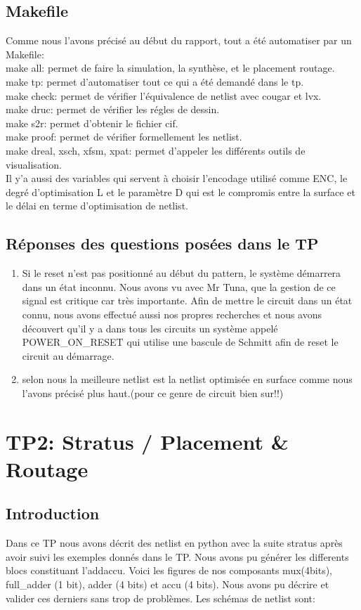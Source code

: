 \documentclass[12pt]{article}
\begin{document}
\subsection{Makefile}
Comme nous l'avons précisé au début du rapport, tout a été automatiser par un Makefile:\\
make all: permet de faire la simulation, la synthèse, et le placement routage.\\
make tp: permet d'automatiser tout ce qui a été demandé dans le tp.\\
make check: permet de vérifier l'équivalence de netlist avec cougar et lvx.\\
make druc: permet de vérifier les régles de dessin.\\
make s2r: permet d'obtenir le fichier cif.\\
make proof: permet de vérifier formellement les netlist.\\
make dreal, xsch, xfsm, xpat: permet d'appeler les différents outils de visualisation.\\
Il y'a aussi des variables qui servent à choisir l'encodage utilisé comme ENC, le degré d'optimisation L et le paramètre D qui est le compromis entre la surface et le délai en terme d'optimisation de netlist.\\
\subsection{Réponses des questions posées dans le TP}
\begin{enumerate}
\item Si le reset n'est pas positionné au début du pattern, le système démarrera dans un état inconnu. Nous avons vu avec Mr Tuna, que la gestion de ce signal est critique car très importante. Afin de mettre le circuit dans un état connu, nous avons effectué aussi nos propres recherches et nous avons découvert qu’il y a dans tous les circuits un système appelé POWER\_ON\_RESET qui utilise une bascule de Schmitt afin de reset le circuit au démarrage.

\item selon nous la meilleure netlist est la netlist optimisée en surface comme nous l'avons précisé plus haut.(pour ce genre de circuit bien sur!!)
\end{enumerate}
\newpage
\section{TP2: Stratus / Placement \& Routage}
\subsection{Introduction}
Dans ce TP nous avons décrit des netlist en python avec la suite stratus après avoir suivi les exemples donnés dans le TP. Nous avons pu générer les differents blocs constituant l'addaccu.  Voici les figures de nos composants mux(4bits), full\_adder (1 bit), adder (4 bits)  et accu (4 bits). Nous avons pu décrire et valider ces derniers sans trop de problèmes. Les schémas de netlist sont:
\end{document}
